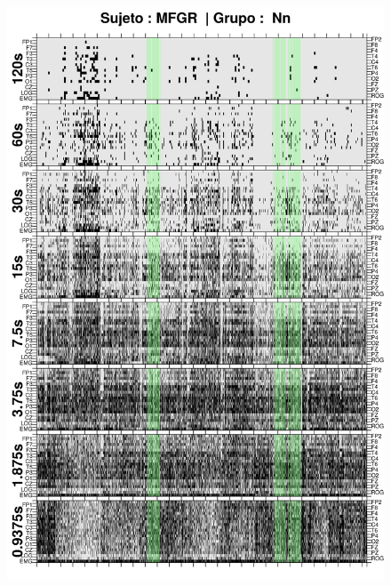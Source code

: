 
\begin{figure}
\centering
\includegraphics[width=0.9\linewidth]
{./img_ejemplos/GURM251148SUE_comp_est_.png} 
\end{figure}
